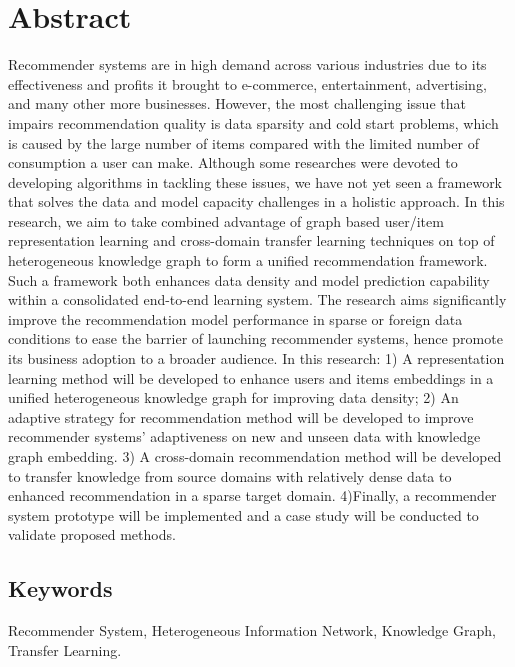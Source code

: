 \section*{Abstract}
Recommender systems are in high demand across various industries due to its effectiveness and profits it brought to e-commerce, entertainment, advertising, and many other more businesses. However, the most challenging issue that impairs recommendation quality is data sparsity and cold start problems, which is caused by the large number of items compared with the limited number of consumption a user can make. Although some researches were devoted to developing algorithms in tackling these issues, we have not yet seen a framework that solves the data and model capacity challenges in a holistic approach. In this research, we aim to take combined advantage of graph based user/item representation learning and cross-domain transfer learning techniques on top of heterogeneous knowledge graph to form a unified recommendation framework. Such a framework both enhances data density and model prediction capability within a consolidated end-to-end learning system. The research aims significantly improve the recommendation model performance in sparse or foreign data conditions to ease the barrier of launching recommender systems, hence promote its business adoption to a broader audience. In this research: 1) A representation learning method will be developed to enhance users and items embeddings in a unified heterogeneous knowledge graph for improving data density; 2) An adaptive strategy for recommendation method will be developed to improve recommender systems’ adaptiveness on new and unseen data with knowledge graph embedding. 3) A cross-domain recommendation method will be developed to transfer knowledge from source domains with relatively dense data to  enhanced recommendation in a sparse target domain. 4)Finally, a recommender system prototype will be implemented and a case study will be conducted to validate proposed methods. 

\subsection*{Keywords} 
Recommender System, Heterogeneous Information Network, Knowledge Graph, Transfer Learning.